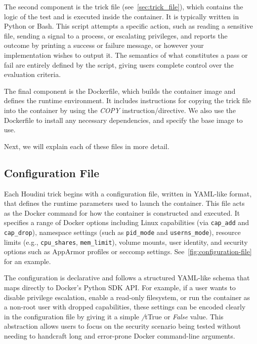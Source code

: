 \begin{doublespace}
The second component is the trick file (see~\ref{sec:trick_file}), which contains the logic of the test and is executed inside the container. It is typically written in Python or Bash. This script attempts a specific action, such as reading a sensitive file, sending a signal to a process, or escalating privileges, and reports the outcome by printing a success or failure message, or however your implementation wishes to output it. The semantics of what constitutes a pass or fail are entirely defined by the script, giving users complete control over the evaluation criteria.

The final component is the Dockerfile, which builds the container image and defines the runtime environment. It includes instructions for copying the trick file into the container by using the \textit{COPY} instruction/directive. We also use the Dockerfile to install any necessary dependencies, and specify the base image to use.

Next, we will explain each of these files in more detail.

\subsection{Configuration File}
\label{sec:configuration}

Each Houdini trick begins with a configuration file, written in YAML-like format, that defines the runtime parameters used to launch the container. This file acts as the Docker command for how the container is constructed and executed. It specifies a range of Docker options including Linux capabilities (via \texttt{cap\_add} and \texttt{cap\_drop}), namespace settings (such as \texttt{pid\_mode} and \texttt{userns\_mode}), resource limits (e.g., \texttt{cpu\_shares}, \texttt{mem\_limit}), volume mounts, user identity, and security options such as AppArmor profiles or seccomp settings. See~\ref{fig:configuration-file} for an example.

The configuration is declarative and follows a structured YAML-like schema that maps directly to Docker's Python SDK API. For example, if a user wants to disable privilege escalation, enable a read-only filesystem, or run the container as a non-root user with dropped capabilities, these settings can be encoded clearly in the configuration file by giving it a simple \textit/t{True} or \textit{False} value. This abstraction allows users to focus on the security scenario being tested without needing to handcraft long and error-prone Docker command-line arguments.


\end{doublespace}
